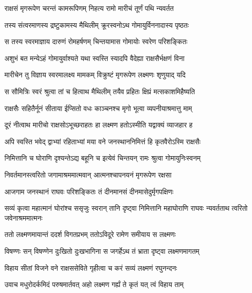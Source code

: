 
\twolineshloka
{राक्षसं मृगरूपेण चरन्तं कामरूपिणम्}
{निहत्य रामो मारीचं तूर्णं पथि न्यवर्तत} %

\twolineshloka
{तस्य संत्वरमाणस्य द्रष्टुकामस्य मैथिलीम्}
{क्रूरस्वनोऽथ गोमायुर्विननादास्य पृष्ठतः} %

\twolineshloka
{स तस्य स्वरमाज्ञाय दारुणं रोमहर्षणम्}
{चिन्तयामास गोमायोः स्वरेण परिशङ्कितः} %

\twolineshloka
{अशुभं बत मन्येऽहं गोमायुर्वाश्यते यथा}
{स्वस्ति स्यादपि वैदेह्या राक्षसैर्भक्षणं विना} %

\twolineshloka
{मारीचेन तु विज्ञाय स्वरमालक्ष्य मामकम्}
{विक्रुष्टं मृगरूपेण लक्ष्मणः शृणुयाद् यदि} %

\twolineshloka
{स सौमित्रिः स्वरं श्रुत्वा तां च हित्वाथ मैथिलीम्}
{तयैव प्रहितः क्षिप्रं मत्सकाशमिहैष्यति} %

\twolineshloka
{राक्षसैः सहितैर्नूनं सीताया ईप्सितो वधः}
{काञ्चनश्च मृगो भूत्वा व्यपनीयाश्रमात्तु माम्} %

\twolineshloka
{दूरं नीत्वाथ मारीचो राक्षसोऽभूच्छराहतः}
{हा लक्ष्मण हतोऽस्मीति यद्वाक्यं व्याजहार ह} %

\twolineshloka
{अपि स्वस्ति भवेद् द्वाभ्यां रहिताभ्यां मया वने}
{जनस्थाननिमित्तं हि कृतवैरोऽस्मि राक्षसैः} %

\twolineshloka
{निमित्तानि च घोराणि दृश्यन्तेऽद्य बहूनि च}
{इत्येवं चिन्तयन् रामः श्रुत्वा गोमायुनिःस्वनम्} %

\twolineshloka
{निवर्तमानस्त्वरितो जगामाश्रममात्मवान्}
{आत्मनश्चापनयनं मृगरूपेण रक्षसा} %

\twolineshloka
{आजगाम जनस्थानं राघवः परिशङ्कितः}
{तं दीनमानसं दीनमासेदुर्मृगपक्षिणः} %

\threelineshloka
{सव्यं कृत्वा महात्मानं घोरांश्च ससृजुः स्वरान्}
{तानि दृष्ट्वा निमित्तानि महाघोराणि राघवः}
{न्यवर्तताथ त्वरितो जवेनाश्रममात्मनः} %

\twolineshloka
{ततो लक्ष्मणमायान्तं ददर्श विगतप्रभम्}
{ततोऽविदूरे रामेण समीयाय स लक्ष्मणः} %

\twolineshloka
{विषण्णः सन् विषण्णेन दुःखितो दुःखभागिना}
{स जगर्हेऽथ तं भ्राता दृष्ट्वा लक्ष्मणमागतम्} %

\twolineshloka
{विहाय सीतां विजने वने राक्षससेविते}
{गृहीत्वा च करं सव्यं लक्ष्मणं रघुनन्दनः} %

\twolineshloka
{उवाच मधुरोदर्कमिदं परुषमार्तवत्}
{अहो लक्ष्मण गर्ह्यं ते कृतं यत् त्वं विहाय ताम्} %

